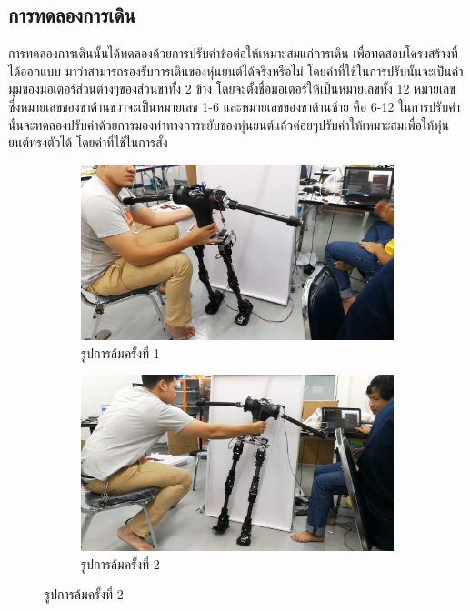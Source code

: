 \subsection{การทดลองการเดิน}
การทดลองการเดินนั้นได้ทดลองด้วยการปรับค่าข้อต่อให้เหมาะสมแก่การเดิน เพื่อทดสอบโครงสร้างที่ได้ออกแบบ
มาว่าสามารถรองรับการเดินของหุ่นยนต์ได้จริงหรือไม่ โดยค่าที่ใช้ในการปรับนั้นจะเป็นค่ามุมของมอเตอร์ส่วนต่างๆของส่วนขาทั้ง 2 ข้าง
โดยจะตั้งชื่อมอเตอร์ให้เป็นหมายเลขทั้ง 12 หมายเลข ซึ่งหมายเลขของขาด้านขวาจะเป็นหมายเลข 1-6 และหมายเลขของขาด้านซ้าย คือ 6-12
ในการปรับค่านั้นจะทดลองปรับค่าด้วยการมองท่าทางการขยับของหุ่นยนต์แล้วค่อยๆปรับค่าให้เหมาะสมเพื่อให้หุ่นยนต์ทรงตัวได้ โดยค่าที่ใช้ในการสั่ง
\begin{figure}[!ht]
    \centering
    \begin{subfigure}[b]{0.4\linewidth}
      \includegraphics[width=\linewidth]{chapter4/images/fall1.png}
      \caption{รูปการล้มครั้งที่ 1}
    \end{subfigure}
    \begin{subfigure}[b]{0.4\linewidth}
      \includegraphics[width=\linewidth]{chapter4/images/fall2.png}
      \caption{รูปการล้มครั้งที่ 2}

\end{subfigure}
\end{figure}
